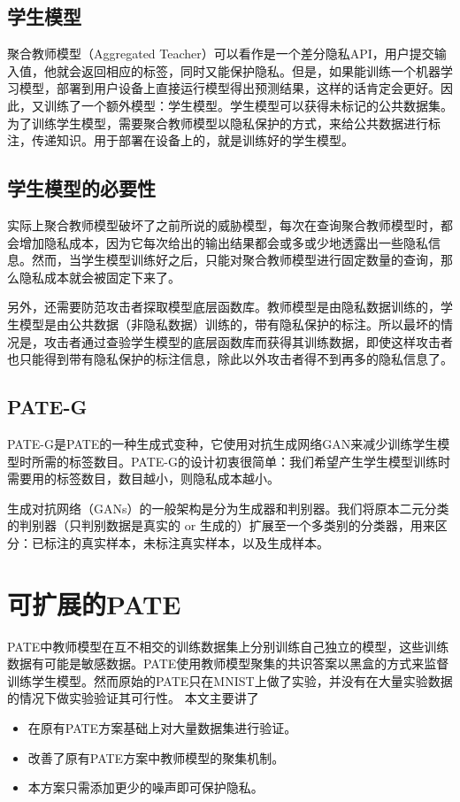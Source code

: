 \documentclass[a4paper]{article}
\begin{document}
\subsection*{学生模型}

聚合教师模型（Aggregated Teacher）可以看作是一个差分隐私API，用户提交输入值，他就会返回相应的标签，同时又能保护隐私。但是，如果能训练一个机器学习模型，部署到用户设备上直接运行模型得出预测结果，这样的话肯定会更好。因此，又训练了一个额外模型：学生模型。学生模型可以获得未标记的公共数据集。为了训练学生模型，需要聚合教师模型以隐私保护的方式，来给公共数据进行标注，传递知识。用于部署在设备上的，就是训练好的学生模型。
\subsection*{学生模型的必要性}

实际上聚合教师模型破坏了之前所说的威胁模型，每次在查询聚合教师模型时，都会增加隐私成本，因为它每次给出的输出结果都会或多或少地透露出一些隐私信息。然而，当学生模型训练好之后，只能对聚合教师模型进行固定数量的查询，那么隐私成本就会被固定下来了。

另外，还需要防范攻击者探取模型底层函数库。教师模型是由隐私数据训练的，学生模型是由公共数据（非隐私数据）训练的，带有隐私保护的标注。所以最坏的情况是，攻击者通过查验学生模型的底层函数库而获得其训练数据，即使这样攻击者也只能得到带有隐私保护的标注信息，除此以外攻击者得不到再多的隐私信息了。
\subsection*{PATE-G}

PATE-G是PATE的一种生成式变种，它使用对抗生成网络GAN来减少训练学生模型时所需的标签数目。PATE-G的设计初衷很简单：我们希望产生学生模型训练时需要用的标签数目，数目越小，则隐私成本越小。

生成对抗网络（GANs）的一般架构是分为生成器和判别器。我们将原本二元分类的判别器（只判别数据是真实的 or 生成的）扩展至一个多类别的分类器，用来区分：已标注的真实样本，未标注真实样本，以及生成样本\cite{Salimans2016ImprovedTF}。


\section{可扩展的PATE}
PATE中教师模型在互不相交的训练数据集上分别训练自己独立的模型，这些训练数据有可能是敏感数据。PATE使用教师模型聚集的共识答案以黑盒的方式来监督训练学生模型。然而原始的PATE\cite{Papernot2016SemisupervisedKT}只在MNIST上做了实验，并没有在大量实验数据的情况下做实验验证其可行性。
本文主要讲了
\begin{itemize}
\item 在原有PATE方案基础上对大量数据集进行验证。
\item 改善了原有PATE方案中教师模型的聚集机制。
\item 本方案只需添加更少的噪声即可保护隐私。
\end{itemize}
\end{document}
